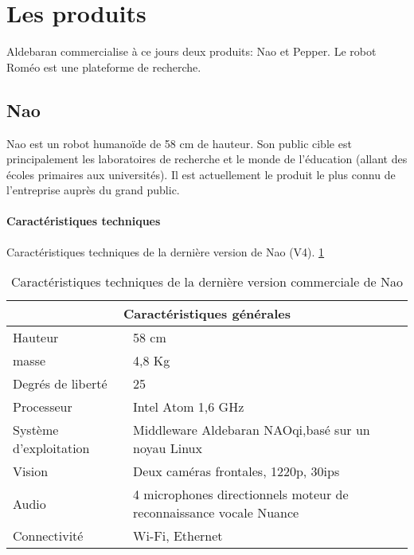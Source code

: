 \section{Les produits}
\label{Entreprise: Les produits}
Aldebaran commercialise à ce jours deux produits: Nao et Pepper. Le robot Roméo est une plateforme de recherche. 

\subsection{Nao}
\label{Entreprise: Les produits: Nao}
Nao est un robot humanoïde de 58 cm de hauteur. Son public cible est principalement les laboratoires de recherche et le monde de l'éducation (allant des écoles primaires aux universités). Il est actuellement le produit le plus connu de l'entreprise auprès du grand public. 

\paragraph{Caractéristiques techniques}
\label{Entreprise:Les produits: Nao: Caractéristiques techniques}
Caractéristiques techniques de la dernière version de Nao (V4). \ref{tab: Caractéristiques technique de Nao}
\newline 

\begin{table}[h]
\begin{tabular}{ | l | p{7cm} | }
\hline
\multicolumn{2}{|c|}{Caractéristiques générales} \\
\hline
Hauteur & 58 cm \\
\hline 
masse & 4,8 Kg \\
\hline 
Degrés de liberté  & 25 \\
\hline
Processeur & Intel Atom 1,6 GHz \\
\hline
Système d'exploitation & Middleware Aldebaran NAOqi,\newline basé sur un noyau Linux \\
\hline 
Vision & Deux caméras frontales, 1220p, 30ips \\
\hline
Audio & 4 microphones directionnels \newline moteur de reconnaissance vocale Nuance  \\
\hline
Connectivité & Wi-Fi, Ethernet \\
\hline
\end{tabular}
\caption[Caractéristiques technique de Nao]{Caractéristiques techniques de la dernière version commerciale  de Nao}
\label {tab: Caractéristiques technique de Nao}
\end{table}

